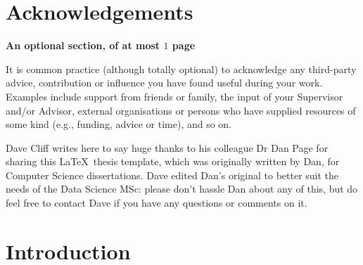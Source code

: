 \documentclass[ %
                    author={Carlos Duran Calle},
                supervisor={Dr. Felipe Campelo},
                    degree={MSc},
                     title={Comparative Machine Learning Analysis for Student Dropout Prediction in a Virtual Learning Environment},
                  subtitle={Incorporating Student Engagement and Socio-Economic Features},
                      type={},
                      year={2025}]{dissertation}
\begin{document}

\chapter*{Acknowledgements}

{\bf An optional section, of at most $1$ page}
\vspace{1cm} 

\noindent
It is common practice (although totally optional) to acknowledge any
third-party advice, contribution or influence you have found useful
during your work.  Examples include support from friends or family, 
the input of your Supervisor and/or Advisor, external organisations 
or persons who  have supplied resources of some kind (e.g., funding, 
advice or time), and so on.

\vspace{1cm}
Dave Cliff writes here to say huge thanks to his colleague Dr Dan Page for sharing this \LaTeX\ thesis template, which was originally written by Dan, for Computer Science dissertations. Dave edited Dan's original to better suit the needs of the Data Science MSc: please don't hassle Dan about any of this, but do feel free to contact Dave if you have any questions or comments on it.  


%

\mainmatter


\chapter{Introduction}
\label{chap:introduction}

\vspace{1cm} 
\end{document}
